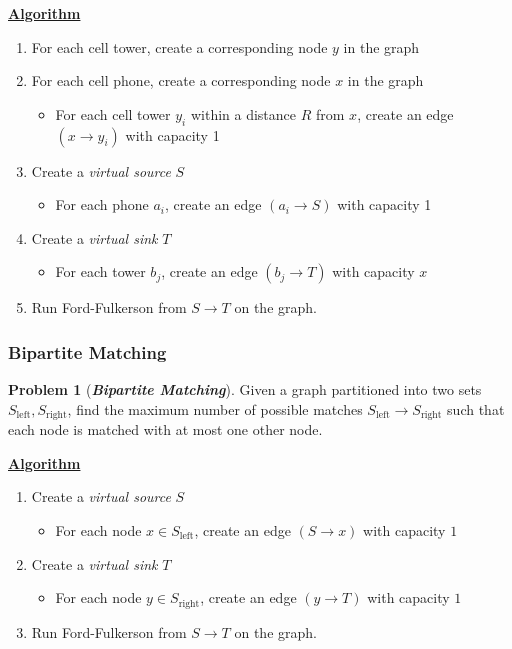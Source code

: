 \documentclass[12pt]{extarticle}
\theoremstyle{definition}
\newtheorem*{problem}{Problem}
\theoremstyle{remark}
\newcommand{\probname}[1]{\noindent \textbf{\textit{#1}}}
\begin{document}
\vspace{8pt}
\noindent\ul{\textbf{Algorithm}}
\begin{enumerate}
    \item For each cell tower, create a corresponding node $y$ in the graph
    \item For each cell phone, create a corresponding node $x$ in the graph \begin{itemize}
        \item For each cell tower $y_i$ within a distance $R$ from $x$, create an edge $(x\to y_i)$ with capacity 1
    \end{itemize}
    \item Create a \textit{virtual source} $S$\begin{itemize}
        \item For each phone $a_i$,  create an edge $(a_i\to S)$ with capacity 1
    \end{itemize}
    \item Create a \textit{virtual sink} $T$ \begin{itemize}
        \item For each tower $b_j$, create an edge $(b_j\to T)$ with capacity $x$
    \end{itemize}
    \item Run Ford-Fulkerson from $S\to T$ on the graph.
\end{enumerate}

\pagebreak
\subsubsection{Bipartite Matching}
\begin{problem}[\probname{Bipartite Matching}]
    Given a graph partitioned into two sets $S_\text{left},S_\text{right}$, find the maximum number of possible matches $S_\text{left}\to S_\text{right}$ such that each node is matched with at most one other node.
\end{problem}

\noindent\ul{\textbf{Algorithm}}
\begin{enumerate}
    \item Create a \textit{virtual source} $S$\begin{itemize}
        \item For each node $x\in S_\text{left}$, create an edge $(S\to x)$ with capacity $1$
    \end{itemize}
    \item Create a \textit{virtual sink} $T$ \begin{itemize}
        \item For each node $y\in S_\text{right}$, create an edge $(y\to T)$ with capacity $1$
    \end{itemize}
    \item Run Ford-Fulkerson from $S\to T$ on the graph.
\end{enumerate}
\end{document}
